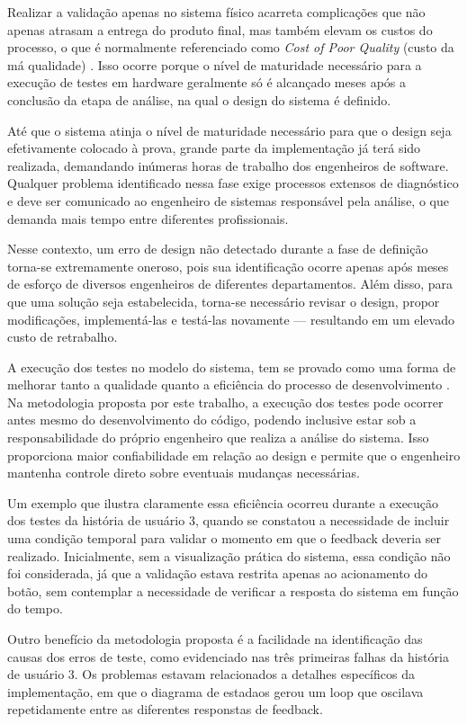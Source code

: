 Realizar a validação apenas no sistema físico acarreta complicações que não apenas atrasam a entrega do produto final, mas também elevam os custos do processo, o que 
é normalmente referenciado como \textit{Cost of Poor Quality} (custo da má qualidade) \cite{costOfPoorQuality}. Isso ocorre porque o nível de maturidade necessário 
para a execução de testes em hardware geralmente só é alcançado meses após a conclusão da etapa de análise, na qual o design do sistema é definido. 

Até que o sistema atinja o nível de maturidade necessário para que o design seja efetivamente colocado à prova, grande parte da implementação já terá sido realizada, 
demandando inúmeras horas de trabalho dos engenheiros de software. Qualquer problema identificado nessa fase exige processos extensos de diagnóstico e deve ser 
comunicado ao engenheiro de sistemas responsável pela análise, o que demanda mais tempo entre diferentes profissionais.

Nesse contexto, um erro de design não detectado durante a fase de definição torna-se extremamente oneroso, pois sua identificação ocorre apenas após meses de esforço 
de diversos engenheiros de diferentes departamentos. Além disso, para que uma solução seja estabelecida, torna-se necessário revisar o design, propor modificações, 
implementá-las e testá-las novamente — resultando em um elevado custo de retrabalho.

A execução dos testes no modelo do sistema, tem se provado como uma forma de melhorar tanto a qualidade quanto a eficiência do processo de desenvolvimento \cite{modelTesting}.
Na metodologia proposta por este trabalho, a execução dos testes pode ocorrer antes mesmo do desenvolvimento do código, podendo inclusive estar sob a responsabilidade 
do próprio engenheiro que realiza a análise do sistema. Isso proporciona maior confiabilidade em relação ao design e permite que o engenheiro mantenha controle direto 
sobre eventuais mudanças necessárias.

Um exemplo que ilustra claramente essa eficiência ocorreu durante a execução dos testes da história de usuário 3, quando se constatou a necessidade de incluir uma 
condição temporal para validar o momento em que o feedback deveria ser realizado. Inicialmente, sem a visualização prática do sistema, essa condição não foi 
considerada, já que a validação estava restrita apenas ao acionamento do botão, sem contemplar a necessidade de verificar a resposta do sistema em função do tempo.

Outro benefício da metodologia proposta é a facilidade na identificação das causas dos erros de teste, como evidenciado nas três primeiras falhas da história de 
usuário 3. Os problemas estavam relacionados a detalhes específicos da implementação, em que o diagrama de estadaos gerou um loop que oscilava repetidamente entre 
as diferentes responstas de feedback.

